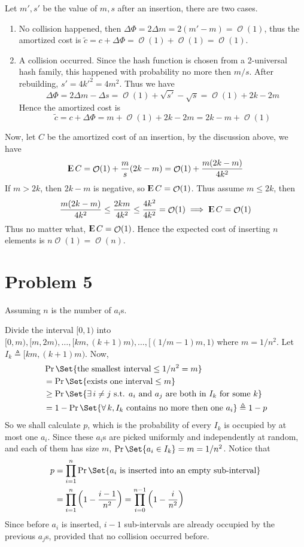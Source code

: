 \documentclass[12pt, a4paper]{article}
\newcommand{\defeq}{\triangleq}
\DeclareMathOperator{\Expect}{{\rm I\kern-.3em E}}
\DeclareMathOperator*{\ord}{\mathcal{O}}
\begin{document}
Let $m', s'$ be the value of $m, s$ after an insertion, there are two cases.
\begin{enumerate}
  \item No collision happened, then $\Delta \Phi = 2 \Delta m = 2(m' - m) = \ord(1)$,
    thus the amortized cost is $\tilde{c} = c + \Delta \Phi = \ord(1) + \ord(1) = \ord(1)$.
  \item A collision occurred. Since the hash function is chosen from a 2-universal hash family,
    this happened with probability no more then $m / s$. After rebuilding, $s' = 4{k'}^2 = 4m^2$.
    Thus we have
    \[ \Delta \Phi = 2 \Delta m - \Delta s = \ord(1) + \sqrt{s'} - \sqrt{s} = \ord(1) + 2k - 2m \]
    Hence the amortized cost is
    \[ \tilde{c} = c + \Delta \Phi = m + \ord(1) + 2k - 2m = 2k - m + \ord(1) \]
\end{enumerate}
Now, let $C$ be the amortized cost of an insertion, by the discussion above, we have
\[ \Expect C = \ord(1) + \frac{m}{s} (2k - m) = \ord(1) + \frac{m (2k - m)}{4k^2} \]
If $m > 2k$, then $2k - m$ is negative, so $\Expect C = \ord(1)$. Thus assume
$m \leq 2k$, then
\[ \frac{m (2k-m)}{4k^2} \leq \frac{2km}{4k^2} \leq \frac{4k^2}{4k^2} = \ord(1) \implies \Expect C = \ord(1) \]
Thus no matter what, $\Expect C = \ord(1)$. Hence the expected cost of inserting $n$ elements
is $n \ord(1) = \ord(n)$.

\section{Problem 5}
Assuming $n$ is the number of $a_i$s.

Divide the interval $[0, 1)$ into $[0, m), [m, 2m), \dots, [km, (k+1)m), \dots, [(1/m-1)m, 1)$
where $m = 1/n^2$. Let $I_k \defeq [km, (k+1)m)$. Now,
\begin{align*}
  &\Pr\Set{ \text{the smallest interval} \leq 1/n^2 = m} \\
  &= \Pr\Set{ \text{exists one interval} \leq m} \\
  &\geq
  \Pr\Set{ \exists\, i \neq j \text{ s.t. } a_i \text{ and } a_j \text{ are both in } I_k \text{ for some } k } \\
  &=
  1 - \Pr\Set{ \forall\, k, I_k \text{ contains no more then one } a_i } \defeq 1 - p
\end{align*}
So we shall calculate $p$, which is the probability of every $I_k$ is occupied by
at most one $a_i$. Since these $a_i$s are picked uniformly and independently at random,
and each of them has size $m$, $\Pr\Set{a_i \in I_k} = m = 1/n^2$.
Notice that
\begin{align*}
  p &= \prod_{i = 1}^n \Pr\Set{a_i \text{ is inserted into an empty sub-interval}} \\
  &= \prod_{i=1}^n \left( 1 - \frac{i-1}{n^2} \right) = \prod_{i = 0}^{n-1} \left( 1 - \frac{i}{n^2} \right)
\end{align*}
Since before $a_i$ is inserted, $i-1$ sub-intervals are already occupied by the previous $a_j$s,
provided that no collision occurred before. \medskip
\end{document}
